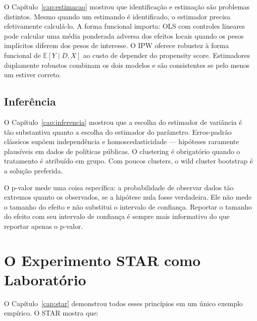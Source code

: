 O Capítulo~\ref{cap:estimacao} mostrou que identificação e estimação são
problemas distintos. Mesmo quando um estimando é identificado, o estimador
precisa efetivamente calculá-lo. A forma funcional importa: OLS com controles
lineares pode calcular uma média ponderada adversa dos efeitos locais quando
os pesos implícitos diferem dos pesos de interesse. O IPW oferece robustez à
forma funcional de $\mathbb{E}[Y \mid D, X]$ ao custo de depender do
propensity score. Estimadores duplamente robustos combinam os dois modelos
e são consistentes se pelo menos um estiver correto.

\subsection*{Inferência}

O Capítulo~\ref{cap:inferencia} mostrou que a escolha do estimador de
variância é tão substantiva quanto a escolha do estimador do parâmetro.
Erros-padrão clássicos supõem independência e homoscedasticidade ---
hipóteses raramente plausíveis em dados de políticas públicas. O clustering
é obrigatório quando o tratamento é atribuído em grupo. Com poucos clusters,
o wild cluster bootstrap é a solução preferida.

O p-valor mede uma coisa específica: a probabilidade de observar dados tão
extremos quanto os observados, se a hipótese nula fosse verdadeira. Ele não
mede o tamanho do efeito e não substitui o intervalo de confiança. Reportar
o tamanho do efeito com seu intervalo de confiança é sempre mais informativo
do que reportar apenas o p-valor.


\section{O Experimento STAR como Laboratório}

O Capítulo~\ref{cap:star} demonstrou todos esses princípios em um único
exemplo empírico. O STAR mostra que:

